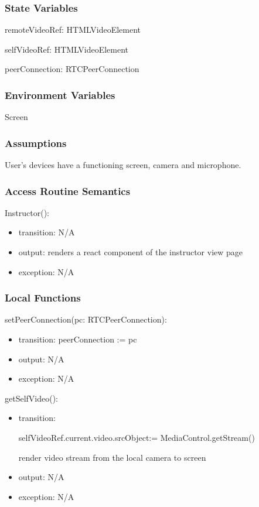 \documentclass[12pt, titlepage]{article}
\begin{document}
\subsubsection{State Variables}

\noindent remoteVideoRef: HTMLVideoElement

\noindent selfVideoRef: HTMLVideoElement

\noindent peerConnection: RTCPeerConnection

\subsubsection{Environment Variables}

\noindent Screen

\subsubsection{Assumptions}

User's devices have a functioning screen, camera and microphone.

\subsubsection{Access Routine Semantics}

\noindent Instructor():
\begin{itemize}
\item transition: N/A
\item output: renders a react component of the instructor view page
\item exception: N/A
\end{itemize}

\subsubsection{Local Functions}

\noindent setPeerConnection(pc: RTCPeerConnection):
\begin{itemize}
\item transition: peerConnection := pc
\item output: N/A
\item exception: N/A
\end{itemize}

\noindent getSelfVideo():
\begin{itemize}
\item transition:

  selfVideoRef.current.video.srcObject:= MediaControl.getStream()

  render video stream from the local camera to screen
\item output: N/A
\item exception: N/A
\end{itemize}
\end{document}
